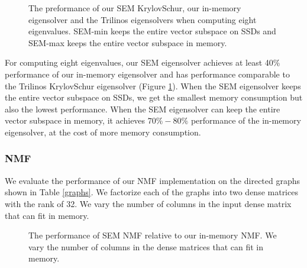 \begin{figure}
	\begin{center}
		\footnotesize
		
		\caption{The preformance of our SEM KrylovSchur, our in-memory eigensolver
			and the Trilinos eigensolvers when computing eight
			eigenvalues. SEM-min keeps the entire vector subspace on SSDs and
		SEM-max keeps the entire vector subspace in memory.}
		\label{fig:eigen}
	\end{center}
\end{figure}

For computing eight eigenvalues, our SEM eigensolver achieves at least 40\%
performance of our in-memory eigensolver and has performance comparable to
the Trilinos KrylovSchur eigensolver (Figure \ref{fig:eigen}). When the SEM
eigensolver keeps the entire vector subspace on SSDs, we get the smallest
memory consumption but also the lowest performance. When the SEM eigensolver
can keep the entire vector subspace in memory, it achieves $70\%-80\%$
performance of the in-memory eigensolver, at the cost of more memory consumption.

\subsubsection{NMF}
We evaluate the performance of our NMF implementation on the directed graphs
shown in Table \ref{graphs}. We factorize each of the graphs into two dense
matrices with the rank of 32. We vary the number of columns in the input dense
matrix that can fit in memory.

\begin{figure}
	\begin{center}
		\footnotesize
		
		\caption{The performance of SEM NMF relative to our in-memory NMF.
			We vary the number of columns in the dense matrices that can fit
		in memory.}
		\label{perf:NMF}
	\end{center}
\end{figure}
